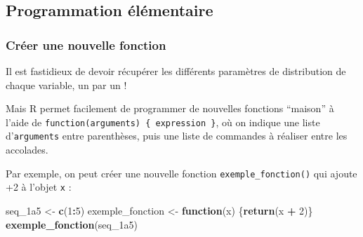 \documentclass[
]{book}
\newenvironment{Shaded}{\begin{snugshade}}{\end{snugshade}}
\newcommand{\AttributeTok}[1]{\textcolor[rgb]{0.13,0.29,0.53}{#1}}
\newcommand{\CommentTok}[1]{\textcolor[rgb]{0.56,0.35,0.01}{\textit{#1}}}
\newcommand{\ConstantTok}[1]{\textcolor[rgb]{0.56,0.35,0.01}{#1}}
\newcommand{\ControlFlowTok}[1]{\textcolor[rgb]{0.13,0.29,0.53}{\textbf{#1}}}
\newcommand{\DecValTok}[1]{\textcolor[rgb]{0.00,0.00,0.81}{#1}}
\newcommand{\FloatTok}[1]{\textcolor[rgb]{0.00,0.00,0.81}{#1}}
\newcommand{\FunctionTok}[1]{\textcolor[rgb]{0.13,0.29,0.53}{\textbf{#1}}}
\newcommand{\NormalTok}[1]{#1}
\newcommand{\OtherTok}[1]{\textcolor[rgb]{0.56,0.35,0.01}{#1}}
\newcommand{\SpecialCharTok}[1]{\textcolor[rgb]{0.81,0.36,0.00}{\textbf{#1}}}
\begin{document}
\begin{Shaded}
\end{Shaded}

\subsection{Programmation élémentaire}\label{programmation-uxe9luxe9mentaire}

\subsubsection{Créer une nouvelle fonction}\label{cruxe9er-une-nouvelle-fonction}

Il est fastidieux de devoir récupérer les différents paramètres de distribution de chaque variable, un par un !

Mais R permet facilement de programmer de nouvelles fonctions ``maison'' à l'aide de \texttt{function(arguments)\ \{\ expression\ \}}, où on indique une liste d'\texttt{arguments} entre parenthèses, puis une liste de commandes à réaliser entre les accolades.

Par exemple, on peut créer une nouvelle fonction \texttt{exemple\_fonction()} qui ajoute +2 à l'objet \texttt{x} :

\begin{Shaded}
\begin{Highlighting}[]
\NormalTok{seq\_1a5 }\OtherTok{\textless{}{-}} \FunctionTok{c}\NormalTok{(}\DecValTok{1}\SpecialCharTok{:}\DecValTok{5}\NormalTok{)}
\NormalTok{exemple\_fonction }\OtherTok{\textless{}{-}} \ControlFlowTok{function}\NormalTok{(x) \{}\FunctionTok{return}\NormalTok{(x }\SpecialCharTok{+} \DecValTok{2}\NormalTok{)\}}
\FunctionTok{exemple\_fonction}\NormalTok{(seq\_1a5)}
\end{Highlighting}
\end{Shaded}
\end{document}
